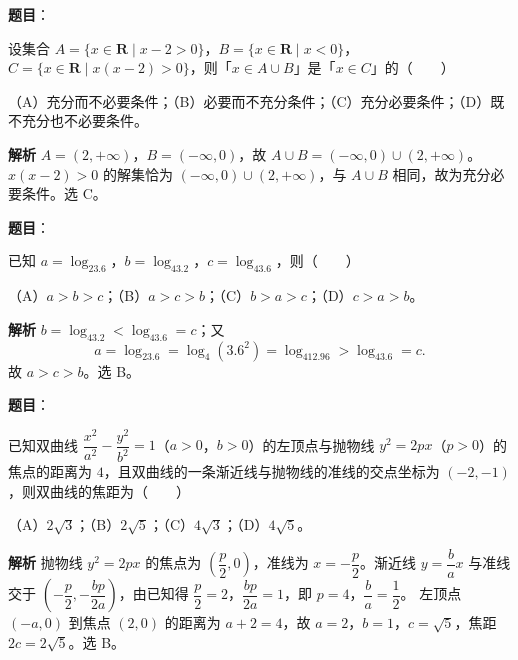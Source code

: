 \begin{answer}

\textbf{题目}：

设集合 $A=\{x\in\mathbf R\mid x-2>0\}$，$B=\{x\in\mathbf R\mid x<0\}$，$C=\{x\in\mathbf R\mid x(x-2)>0\}$，则「$x\in A\cup B$」是「$x\in C$」的\mbox{（　　）}

（A）充分而不必要条件；（B）必要而不充分条件；（C）充分必要条件；（D）既不充分也不必要条件。

\textbf{解析}
$A=(2,+\infty)$，$B=(-\infty,0)$，故 $A\cup B=(-\infty,0)\cup(2,+\infty)$。
$x(x-2)>0$ 的解集恰为 $(-\infty,0)\cup(2,+\infty)$，与 $A\cup B$ 相同，故为充分必要条件。选 C。


\end{answer}
\begin{answer}

\textbf{题目}：

已知 $a=\log_23.6$，$b=\log_43.2$，$c=\log_43.6$，则\mbox{（　　）}

（A）$a>b>c$；（B）$a>c>b$；（C）$b>a>c$；（D）$c>a>b$。

\textbf{解析}
$b=\log_43.2<\log_43.6=c$；又
\nopagebreak[4]
\[a=\log_23.6=\log_4(3.6^2)=\log_412.96>\log_43.6=c.\]
故 $a>c>b$。选 B。


\end{answer}
\begin{answer}

\textbf{题目}：

已知双曲线 $\dfrac{x^2}{a^2}-\dfrac{y^2}{b^2}=1$（$a>0$，$b>0$）的左顶点与抛物线 $y^2=2px$（$p>0$）的焦点的距离为 $4$，且双曲线的一条渐近线与抛物线的准线的交点坐标为 $(-2,-1)$，则双曲线的焦距为\mbox{（　　）}

（A）$2\sqrt3$；（B）$2\sqrt5$；（C）$4\sqrt3$；（D）$4\sqrt5$。

\textbf{解析}
抛物线 $y^2=2px$ 的焦点为 $\left(\dfrac p2,0\right)$，准线为 $x=-\dfrac p2$。渐近线 $y=\dfrac bax$ 与准线交于 $\left(-\dfrac p2,-\dfrac{bp}{2a}\right)$，由已知得 $\dfrac p2=2$，$\dfrac{bp}{2a}=1$，即 $p=4$，$\dfrac ba=\dfrac12$。
左顶点 $(-a,0)$ 到焦点 $(2,0)$ 的距离为 $a+2=4$，故 $a=2$，$b=1$，$c=\sqrt5$，焦距 $2c=2\sqrt5$。选 B。


\end{answer}

